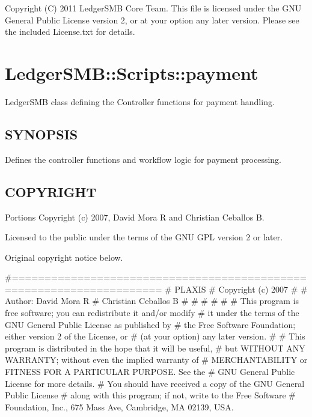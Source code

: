 Copyright (C) 2011 LedgerSMB Core Team.  This file is licensed under the GNU 
General Public License version 2, or at your option any later version.  Please
see the included License.txt for details.

\section{LedgerSMB::Scripts::payment\label{LedgerSMB::Scripts::payment}}


LedgerSMB class defining the Controller functions for payment handling.

\subsection*{SYNOPSIS\label{LedgerSMB::Scripts::payment_SYNOPSIS}}


Defines the controller functions and workflow logic for payment processing.

\subsection*{COPYRIGHT\label{LedgerSMB::Scripts::payment_COPYRIGHT}}


Portions Copyright (c) 2007, David Mora R and Christian Ceballos B.



Licensed to the public under the terms of the GNU GPL version 2 or later.



Original copyright notice below.



\#=====================================================================
\# PLAXIS
\# Copyright (c) 2007
\#
\#  Author: David Mora R
\# 	   Christian Ceballos B	   
\#
\#
\#
\#  
\#
\# This program is free software; you can redistribute it and/or modify
\# it under the terms of the GNU General Public License as published by
\# the Free Software Foundation; either version 2 of the License, or
\# (at your option) any later version.
\#
\# This program is distributed in the hope that it will be useful,
\# but WITHOUT ANY WARRANTY; without even the implied warranty of
\# MERCHANTABILITY or FITNESS FOR A PARTICULAR PURPOSE.  See the
\# GNU General Public License for more details.
\# You should have received a copy of the GNU General Public License
\# along with this program; if not, write to the Free Software
\# Foundation, Inc., 675 Mass Ave, Cambridge, MA 02139, USA.

